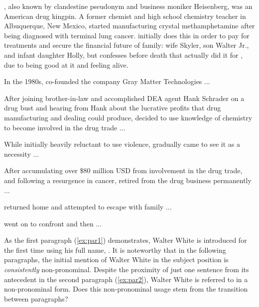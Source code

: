 \begin{exe}
	\ex \label{ex:walter}
	\begin{xlist}
		\item {}, also known by  clandestine pseudonym and business moniker Heisenberg, was an American drug kingpin. A former chemist and high school chemistry teacher in Albuquerque, New Mexico,  started manufacturing crystal methamphetamine after being diagnosed with terminal lung cancer.  initially does this in order to pay for  treatments and secure the financial future of  family: wife Skyler, son Walter Jr., and infant daughter Holly, but confesses before  death that  actually did it for , due to being good at it and feeling alive. \label{ex:par1}
		\item In the 1980s,  co-founded the company Gray Matter Technologies ... \label{ex:par2}
		\item After joining  brother-in-law and accomplished DEA agent Hank Schrader on a drug bust and hearing from Hank about the lucrative profits that drug manufacturing and dealing could produce,  decided to use  knowledge of chemistry to become involved in the drug trade ... \label{ex:par3}
		\item While initially heavily reluctant to use violence,  gradually came to see it as a necessity ... \label{ex:par4}
		\item After accumulating over \$80 million USD from  involvement in the drug trade, and following a resurgence in  cancer,  retired from the drug business permanently ... \label{ex:par5}
		\item {} returned home and attempted to escape with  family ... \label{ex:par6}
		\item {} went on to confront and then ... \label{ex:par7}
	\end{xlist}
\end{exe}

As the first paragraph (\ref{ex:par1}) demonstrates, Walter White is introduced for the first time using his full name, . It is noteworthy that in the following paragraphs, the initial mention of Walter White in the subject position is \emph{consistently} non-pronominal. Despite the proximity of just one sentence from its antecedent in the second paragraph (\ref{ex:par2}), Walter White is referred to in a non-pronominal form. Does this non-pronominal usage stem from the transition between paragraphs?

